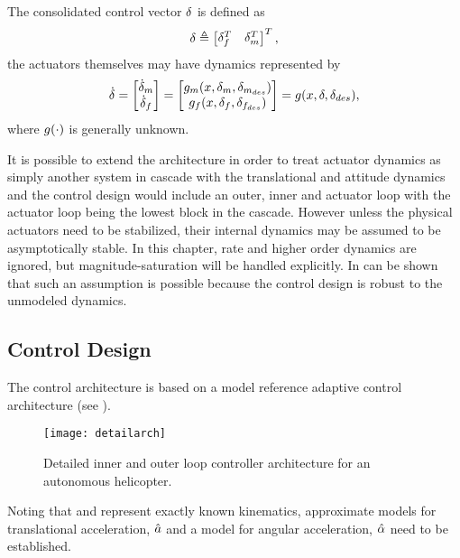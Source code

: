 The consolidated control vector $\delta$ is defined as
\[
\delta \triangleq
\begin{bmatrix}\delta_f^T &\delta_m^T\end{bmatrix}^T,
\]
the actuators themselves may have dynamics represented by
\begin{equation}
\label{e:g} \dot{\delta} =
\begin{bmatrix}
\dot{\delta}_m \\
\dot{\delta}_f
\end{bmatrix}
=
\begin{bmatrix}
g_m(x,\delta_m,\delta_{m_{des}})\\
g_f(x,\delta_f,\delta_{f_{des}})
\end{bmatrix}
= g(x,\delta,\delta_{des}),
\end{equation} where $g(\cdot)$ is generally unknown.
\begin{note}
It is possible to extend the architecture in order to treat actuator dynamics as simply another system in cascade with the translational and attitude dynamics and the control design would include an outer, inner and actuator loop with the actuator loop being the lowest block in the cascade. However unless the physical actuators need to be stabilized, their internal dynamics may be assumed to be asymptotically stable. In this chapter, rate and higher order dynamics are ignored, but magnitude-saturation will be handled explicitly. In can be shown that such an assumption is possible because the control design is robust to the unmodeled dynamics\cite{kannan:phd}.
\end{note}



\subsection{Control Design}\label{s:controller}
The control architecture is based on a  model reference adaptive control architecture (see ).%
\begin{figure}
  \centering\texttt{[image: detailarch]}
  \caption{Detailed inner and outer loop controller architecture for an autonomous helicopter.}
  \label{f:detailarch}
\end{figure}
Noting that  and  represent exactly known kinematics, approximate models for translational acceleration, $\hat{a}$ and a model for angular acceleration, $\hat{\alpha}$ need to be established.

